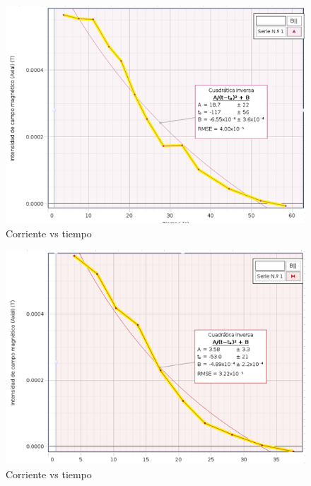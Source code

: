 \documentclass{article}
\begin{document}
\begin{figure}[H]
   \centering
   \includegraphics[scale=0.4]{../imgs/a1.png}
   \caption{Corriente vs tiempo}
   \label{Fig:2}
\end{figure}


\begin{figure}[H]
   \centering
   \includegraphics[scale=0.4]{../imgs/a2.png}
   \caption{Corriente vs tiempo}
   \label{Fig:3}
\end{figure}
\end{document}
